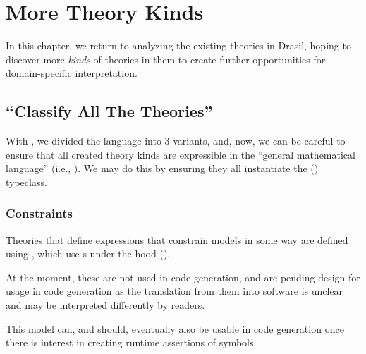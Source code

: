 \chapter{More Theory Kinds}
\label{chap:more-theory-kinds}

In this chapter, we return to analyzing the existing theories in Drasil, hoping
to discover more \textit{kinds} of theories in them to create further
opportunities for domain-specific interpretation.

\section{\textquotedblleft{}Classify All The Theories\textquotedblright{}}

With , we divided the \Expr{} language into 3 variants,
and, now, we can be careful to ensure that all created theory kinds are
expressible in the ``general mathematical language'' (i.e., \ModelExpr{}). We
may do this by ensuring they all instantiate the \Express{}
() typeclass.


\subsection{Constraints}

\currentConstraintSetHaskell{}

Theories that define expressions that constrain models in some way are defined
using \EquationalConstraints{}, which use \ConstraintSet{}s under the hood
().
	
At the moment, these are not used in code generation, and are pending design for
usage in code generation as the translation from them into software is unclear
and may be interpreted differently by readers.

This model can, and should, eventually also be usable in code generation once
there is interest in creating runtime assertions of symbols.






























